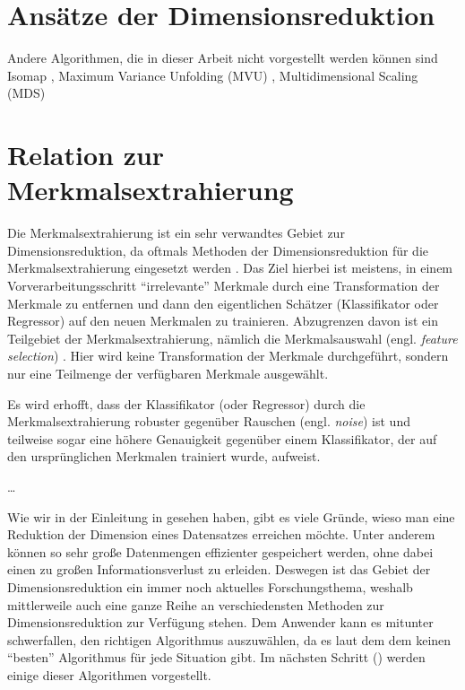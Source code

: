 
\section{Ansätze der Dimensionsreduktion}
\label{ch:Dimensionsreduktion:Ansaetze}

Andere Algorithmen, die in dieser Arbeit nicht vorgestellt werden können sind Isomap \parencite{Tenenbaum.2000}, Maximum Variance Unfolding (MVU) \parencite{Weinberger.2006}, Multidimensional Scaling (MDS) \parencites{Kruskal.1964}{Cox.2008}

\section{Relation zur Merkmalsextrahierung}
\label{ch:Dimensionsreduktion:Merkmalsextrahierung}

Die Merkmalsextrahierung ist ein sehr verwandtes Gebiet zur Dimensionsreduktion, da oftmals
Methoden der Dimensionsreduktion für die Merkmalsextrahierung eingesetzt werden \parencite[3]{Guyon.2006b}. Das Ziel hierbei ist meistens, in einem Vorverarbeitungsschritt
\enquote{irrelevante} Merkmale durch eine Transformation der Merkmale zu entfernen und dann den
eigentlichen Schätzer (Klassifikator oder Regressor) auf den neuen Merkmalen zu trainieren.
Abzugrenzen davon ist ein Teilgebiet der Merkmalsextrahierung, nämlich die Merkmalsauswahl (engl.
\textit{feature selection}) \parencite{Blum.1997}. Hier wird keine Transformation der Merkmale durchgeführt, sondern nur eine
Teilmenge der verfügbaren Merkmale ausgewählt.

Es wird erhofft, dass der Klassifikator (oder Regressor) durch die Merkmalsextrahierung robuster
gegenüber Rauschen (engl. \textit{noise}) ist und teilweise sogar eine höhere Genauigkeit gegenüber
einem Klassifikator, der auf den ursprünglichen Merkmalen trainiert wurde, aufweist.

\ldots

Wie wir in der Einleitung in  gesehen haben, gibt es viele Gründe, wieso man
eine Reduktion der Dimension eines Datensatzes erreichen möchte. Unter anderem können so sehr große
Datenmengen effizienter gespeichert werden, ohne dabei einen zu großen Informationsverlust zu
erleiden. Deswegen ist das Gebiet der Dimensionsreduktion ein immer noch aktuelles Forschungsthema,
weshalb mittlerweile auch eine ganze Reihe an verschiedensten Methoden zur Dimensionsreduktion zur
Verfügung stehen. Dem Anwender kann es mitunter schwerfallen, den richtigen Algorithmus
auszuwählen, da es laut dem dem  \parencite{Wolpert.1997} keinen \enquote{besten} Algorithmus für jede Situation gibt. Im nächsten
Schritt () werden einige dieser Algorithmen vorgestellt.